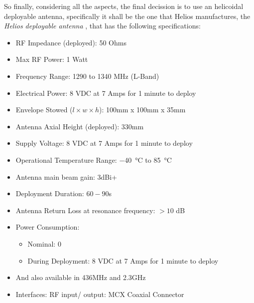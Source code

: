So finally, considering all the aspects, the final decission is to use an helicoidal
deployable antenna, specifically it shall be the one that Helios \cite{Helios}
manufactures, the \textit{Helios deployable antenna} \cite{HeliosAntenna},
that has the following specifications:

\begin{itemize}
	\item RF Impedance (deployed): 50 Ohms
	\item Max RF Power: 1 Watt
	\item Frequency Range: 1290 to 1340 MHz (L-Band)
	\item Electrical Power: 8 VDC at 7 Amps for 1 minute to deploy
	\item Envelope Stowed ($l \times w \times h$): 100mm x 100mm x 35mm
	\item Antenna Axial Height (deployed): 330mm
	\item Supply Voltage: 8 VDC at 7 Amps for 1 minute to deploy
	\item Operational Temperature Range: \SI{-40}{\degreeCelsius} to \SI{85}{\degreeCelsius}
	\item Antenna main beam gain: 3dBi+
	\item Deployment Duration: $60-90$s
	\item Antenna Return Loss at resonance frequency: $ >10$ dB
	\item Power Consumption:
	\begin{itemize}
		\item Nominal: 0
		\item During Deployment: 8 VDC at 7 Amps for 1 minute to deploy
	\end{itemize}
	\item And also available in 436MHz and 2.3GHz
	\item Interfaces: RF input/ output: MCX Coaxial Connector
\end{itemize}
